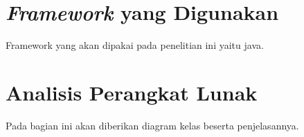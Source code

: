 \section{\textit{Framework} yang Digunakan}
\label{framework}
Framework yang akan dipakai pada penelitian ini yaitu java.
	
	
\section{Analisis Perangkat Lunak}
\label{analisisPL}
Pada bagian ini akan diberikan diagram kelas beserta penjelasannya.


